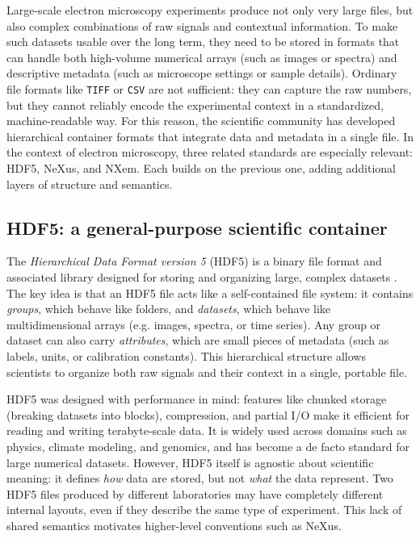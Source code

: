 Large-scale electron microscopy experiments produce not only very large files, but also complex combinations of raw signals and contextual information. 
To make such datasets usable over the long term, they need to be stored in formats that can handle both high-volume numerical arrays (such as images or spectra) and descriptive metadata (such as microscope settings or sample details). 
Ordinary file formats like \texttt{TIFF} or \texttt{CSV} are not sufficient: they can capture the raw numbers, but they cannot reliably encode the experimental context in a standardized, machine-readable way. 
For this reason, the scientific community has developed hierarchical container formats that integrate data and metadata in a single file. 
In the context of electron microscopy, three related standards are especially relevant: HDF5, NeXus, and NXem. 
Each builds on the previous one, adding additional layers of structure and semantics.

\subsection{HDF5: a general-purpose scientific container}

The \textit{Hierarchical Data Format version 5} (HDF5) is a binary file format and associated library designed for storing and organizing large, complex datasets \parencite{nexusManual}. 
The key idea is that an HDF5 file acts like a self-contained file system: it contains \textit{groups}, which behave like folders, and \textit{datasets}, which behave like multidimensional arrays (e.g. images, spectra, or time series). 
Any group or dataset can also carry \textit{attributes}, which are small pieces of metadata (such as labels, units, or calibration constants). 
This hierarchical structure allows scientists to organize both raw signals and their context in a single, portable file. 

HDF5 was designed with performance in mind: features like chunked storage (breaking datasets into blocks), compression, and partial I/O make it efficient for reading and writing terabyte-scale data. 
It is widely used across domains such as physics, climate modeling, and genomics, and has become a de facto standard for large numerical datasets. 
However, HDF5 itself is agnostic about scientific meaning: it defines \emph{how} data are stored, but not \emph{what} the data represent. 
Two HDF5 files produced by different laboratories may have completely different internal layouts, even if they describe the same type of experiment. 
This lack of shared semantics motivates higher-level conventions such as NeXus.

